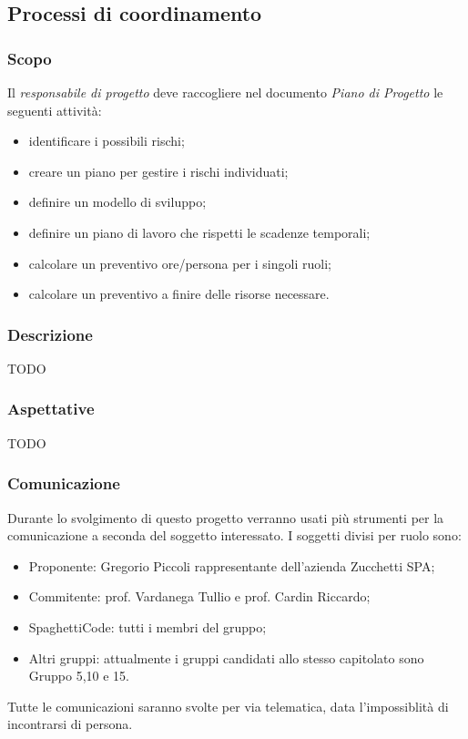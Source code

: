\documentclass[../norme-di-progetto.tex]{subfiles}
\begin{document}
\subsection{Processi di coordinamento}

    \subsubsection{Scopo}
    Il \emph{responsabile di progetto} deve raccogliere nel documento \emph{Piano di Progetto} le seguenti attività:
    \begin{itemize}
        \item identificare i possibili rischi;
        \item creare un piano per gestire i rischi individuati;
        \item definire un modello di sviluppo;
        \item definire un piano di lavoro che rispetti le scadenze temporali;
        \item calcolare un preventivo ore/persona per i singoli ruoli;
        \item calcolare un preventivo a finire delle risorse necessare.
    \end{itemize}

    \subsubsection{Descrizione}
    TODO

    \subsubsection{Aspettative}
    TODO

    \subsubsection{Comunicazione}
    Durante lo svolgimento di questo progetto verranno usati più strumenti per la comunicazione a seconda del soggetto interessato. I soggetti divisi per ruolo sono:
    \begin{itemize}
        \item Proponente: Gregorio Piccoli rappresentante dell'azienda Zucchetti SPA;
        \item Commitente: prof. Vardanega Tullio e prof. Cardin Riccardo;
        \item SpaghettiCode: tutti i membri del gruppo;
        \item Altri gruppi: attualmente i gruppi candidati allo stesso capitolato sono Gruppo 5,10 e 15.
    \end{itemize}
    Tutte le comunicazioni saranno svolte per via telematica, data l'impossiblità di incontrarsi di persona.
\end{document}
